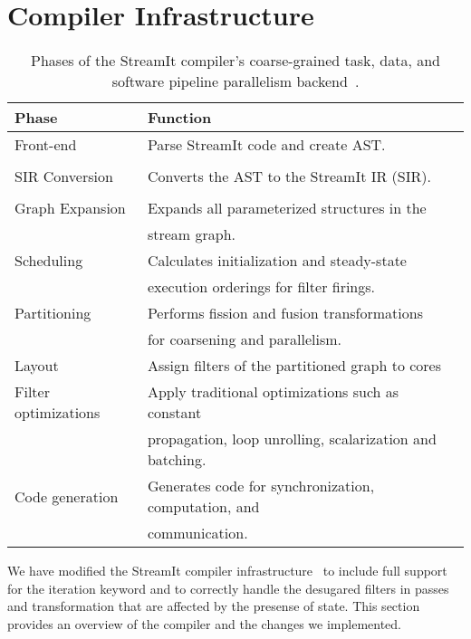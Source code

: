 \section{Compiler Infrastructure}
\label{sec:compiler}

\begin{table}[t]
\begin{center}
\scriptsize
\begin{tabular}{|l|l|} \hline
{\bf Phase} & {\bf Function} \\
\hline \hline
Front-end & Parse StreamIt code and create AST. \\ &\\
\hline
SIR Conversion & Converts the AST to the StreamIt IR (SIR). \\ &\\
\hline
Graph Expansion & Expands all parameterized structures in the \\
                & stream graph. \\
\hline
Scheduling & Calculates initialization and steady-state \\
           & execution orderings for filter firings. \\
\hline
Partitioning & Performs fission and fusion transformations \\
             & for coarsening and parallelism. \\
\hline
Layout & Assign filters of the partitioned graph to cores \\
\hline
Filter optimizations & Apply traditional optimizations such as
constant \\
& propagation, loop unrolling, scalarization and batching. \\
\hline
Code generation & Generates code for synchronization, computation, and \\
& communication. \\
\hline
\end{tabular}
\caption{\protect\small Phases of the StreamIt compiler's
  coarse-grained task, data, and software pipeline parallelism backend~\cite{gordon-asplos06}.
\label{tab:phases}}
\end{center}
\end{table}

We have modified the StreamIt compiler
infrastructure~\cite{streamitweb} to include full support for the
iteration keyword and to correctly handle the desugared filters in
passes and transformation that are affected by the presense of state.
This section provides an overview of the compiler and the changes we
implemented.

